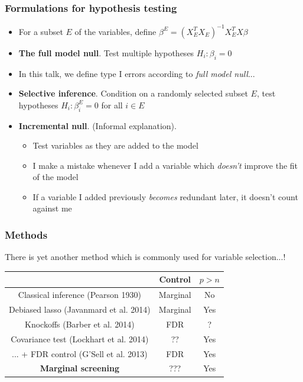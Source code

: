 \documentclass{beamer}
\begin{document}
\begin{frame}
\frametitle{Formulations for hypothesis testing}
\begin{itemize}
\item<1-5> For a subset $E$ of the variables, define $\beta^E = (X_E^T X_E)^{-1} X_E^T X\beta$
\item<2-> \textbf{The full model null}.  Test multiple hypotheses $H_i: \beta_i = 0$
\item<5> In this talk, we define type I errors according to \emph{full model
  null}... 
\item<3> \textbf{Selective inference}.  Condition on a randomly selected subset $E$, test hypotheses $H_i: \beta^E_i = 0$ for all $i \in E$
\item<4> \textbf{Incremental null}.  (Informal explanation).
\begin{itemize}
\item Test variables as they are added to the model
\item I make a mistake whenever I add a variable which \emph{doesn't} improve the fit of the model
\item If a variable I added previously \emph{becomes} redundant later, it doesn't count against me
\end{itemize}
\end{itemize}
\end{frame}


\begin{frame}
\frametitle{Methods}
There is yet another method which is commonly used for variable selection...!
\begin{center}
\begin{tabular}{|c|c|c|} \hline
 & Control & $p > n$\\ \hline
Classical inference (Pearson 1930) & Marginal & No \\ \hline
Debiased lasso (Javanmard et al. 2014) & Marginal & Yes\\ \hline
Knockoffs (Barber et al. 2014) & FDR & ? \\ \hline
Covariance test (Lockhart et al. 2014) &  ?? & Yes \\
... + FDR control (G'Sell et al. 2013) &  FDR & Yes \\ \hline
\textbf{Marginal screening} & ??? & Yes \\ \hline
\end{tabular}
\end{center}
\end{frame}
\end{document}
